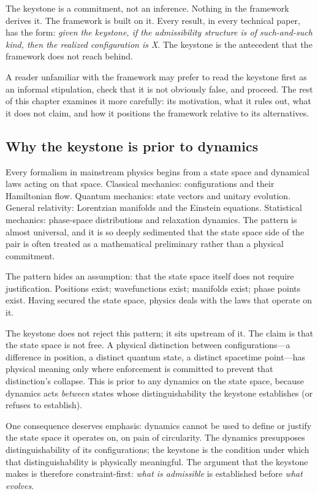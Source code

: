 \documentclass[11pt]{article}
\begin{document}
The keystone is a commitment, not an inference. Nothing in the framework derives it. The framework is built on it. Every result, in every technical paper, has the form: \emph{given the keystone, if the admissibility structure is of such-and-such kind, then the realized configuration is X}. The keystone is the antecedent that the framework does not reach behind.

A reader unfamiliar with the framework may prefer to read the keystone first as an informal stipulation, check that it is not obviously false, and proceed. The rest of this chapter examines it more carefully: its motivation, what it rules out, what it does not claim, and how it positions the framework relative to its alternatives.

\subsection{Why the keystone is prior to dynamics}\label{sec:keystone_prior_dynamics}

Every formalism in mainstream physics begins from a state space and dynamical laws acting on that space. Classical mechanics: configurations and their Hamiltonian flow. Quantum mechanics: state vectors and unitary evolution. General relativity: Lorentzian manifolds and the Einstein equations. Statistical mechanics: phase-space distributions and relaxation dynamics. The pattern is almost universal, and it is so deeply sedimented that the state space side of the pair is often treated as a mathematical preliminary rather than a physical commitment.

The pattern hides an assumption: that the state space itself does not require justification. Positions exist; wavefunctions exist; manifolds exist; phase points exist. Having secured the state space, physics deals with the laws that operate on it.

The keystone does not reject this pattern; it sits upstream of it. The claim is that the state space is not free. A physical distinction between configurations---a difference in position, a distinct quantum state, a distinct spacetime point---has physical meaning only where enforcement is committed to prevent that distinction's collapse. This is prior to any dynamics on the state space, because dynamics acts \emph{between} states whose distinguishability the keystone establishes (or refuses to establish).

One consequence deserves emphasis: dynamics cannot be used to define or justify the state space it operates on, on pain of circularity. The dynamics presupposes distinguishability of its configurations; the keystone is the condition under which that distinguishability is physically meaningful. The argument that the keystone makes is therefore constraint-first: \emph{what is admissible} is established before \emph{what evolves}.
\end{document}
